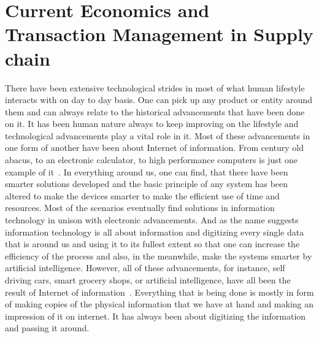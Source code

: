 \maketitle

\section{Current Economics and Transaction Management in Supply chain}

There have been extensive technological strides in most of what human
lifestyle interacts with on day to day basis. One can pick up any
product or entity around them and can always relate to the historical
advancements that have been done on it. It has been human nature
always to keep improving on the lifestyle and technological
advancements play a vital role in it. Most of these advancements in
one form of another have been about Internet of information. From
century old abacus, to an electronic calculator, to high performance
computers is just one example of it~\cite{tapscott1}. In everything
around us, one can find, that there have been smarter solutions
developed and the basic principle of any system has been altered to
make the devices smarter to make the efficient use of time and
resources. Most of the scenarios eventually find solutions in
information technology in unison with electronic advancements. And as
the name suggests information technology is all about information and
digitizing every single data that is around us and using it to its
fullest extent so that one can increase the efficiency of the process
and also, in the meanwhile, make the systems smarter by artificial
intelligence. However, all of these advancements, for instance, self
driving cars, smart grocery shops, or artificial intelligence, have
all been the result of Internet of information~\cite{tapscott1}.
Everything that is being done is mostly in form of making copies of
the physical information that we have at hand and making an impression
of it on internet. It has always been about digitizing the information
and passing it around.

